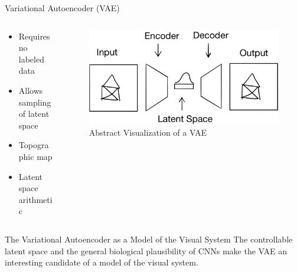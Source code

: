 \documentclass{beamer}
\begin{document}
\begin{frame}{Variational Autoencoder (VAE)}
\begin{columns}
\begin{column}{0.48\textwidth}
\begin{itemize}
\item Requires no labeled data
\item Allows sampling of latent space
\item Topographic map
\item Latent space arithmetic
\end{itemize}
\end{column}
\begin{column}{0.48\textwidth}
\begin{figure}
\centering
\includegraphics[width=\textwidth]{pres_imgs/vae_sketch.png}
\caption{Abstract Visualization of a VAE}
\label{fig:vae_sketch}
\end{figure}
\end{column}
\end{columns}
\end{frame}
\begin{frame}{The Variational Autoencoder as a Model of the Visual System}
The controllable latent space and the general biological plausibility of CNNs make the VAE an interesting candidate of a model of the visual system.
\end{frame}
\end{document}
